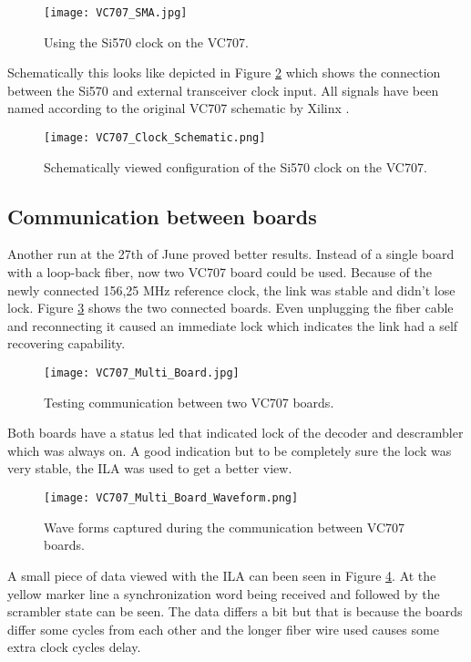	\begin{figure}[H]
		\centering
		\texttt{[image: VC707\_SMA.jpg]}	
		\caption{Using the Si570 clock on the VC707.}
		\label{Fig:VC707_SMA}
	\end{figure}

	Schematically this looks like depicted in Figure \ref{Fig:VC707_Clock_Schematic} which shows the connection between the Si570 and external transceiver clock input. All signals have been named according to the original VC707 schematic by Xilinx \cite{VC707_Schematic}.
	
	\begin{figure}[H]
		\centering
		\texttt{[image: VC707\_Clock\_Schematic.png]}	
		\caption{Schematically viewed configuration of the Si570 clock on the VC707.}
		\label{Fig:VC707_Clock_Schematic}
	\end{figure}

	\subsection{Communication between boards}
	Another run at the 27th of June proved better results. Instead of a single board with a loop-back fiber, now two VC707 board could be used. Because of the newly connected 156,25 MHz reference clock, the link was stable and didn't lose lock. Figure \ref{Fig:VC707_Multi_Board} shows the two connected boards. Even unplugging the fiber cable and reconnecting it caused an immediate lock which indicates the link had a self recovering capability.
	
	\begin{figure}[H]
		\centering
		\texttt{[image: VC707\_Multi\_Board.jpg]}	
		\caption{Testing communication between two VC707 boards.}
		\label{Fig:VC707_Multi_Board}
	\end{figure}
	
	Both boards have a status led that indicated lock of the decoder and descrambler which was always on. A good indication but to be completely sure the lock was very stable, the ILA was used to get a better view.
	
	\begin{figure}[H]
		\centering
		\texttt{[image: VC707\_Multi\_Board\_Waveform.png]}	
		\caption{Wave forms captured during the communication between VC707 boards.}
		\label{Fig:VC707_Multi_Board_Waveform}
	\end{figure}
	 
	A small piece of data viewed with the ILA can been seen in Figure \ref{Fig:VC707_Multi_Board_Waveform}. At the yellow marker line a synchronization word being received and followed by the scrambler state can be seen. The data differs a bit but that is because the boards differ some cycles from each other and the longer fiber wire used causes some extra clock cycles delay. 
	
